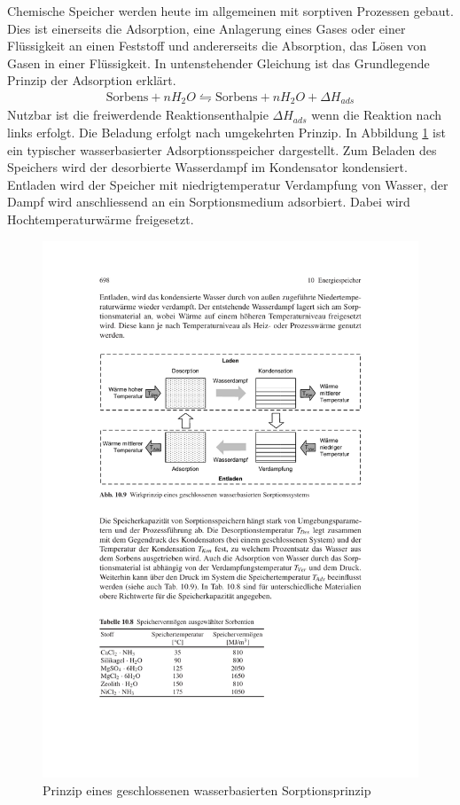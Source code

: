 \documentclass[11pt,a4paper]{scrartcl}
\begin{document}
Chemische Speicher werden heute im allgemeinen mit sorptiven Prozessen gebaut.
Dies ist einerseits die Adsorption, eine Anlagerung eines Gases oder einer
Flüssigkeit an einen Feststoff und andererseits die Absorption, das Lösen von
Gasen in einer Flüssigkeit. In untenstehender Gleichung ist das Grundlegende
Prinzip der Adsorption erklärt.
\begin{align}
\text{Sorbens}+nH_2O\leftrightharpoons \text{Sorbens}+nH_2O+\Delta H_{ads}
\end{align}
Nutzbar ist die freiwerdende Reaktionsenthalpie $\Delta H_{ads}$ wenn die
Reaktion nach links erfolgt. Die Beladung erfolgt nach umgekehrten Prinzip.
In Abbildung \ref{fig:Sorption} ist ein typischer wasserbasierter
Adsorptionsspeicher dargestellt. Zum Beladen des Speichers wird der desorbierte
Wasserdampf im Kondensator kondensiert. Entladen wird der Speicher mit
niedrigtemperatur Verdampfung von Wasser, der Dampf wird anschliessend an ein
Sorptionsmedium adsorbiert. Dabei wird Hochtemperaturwärme freigesetzt. 
\cite{Wesselak}

\begin{figure}[h]
\begin{center}
\includegraphics[scale=1]{images/sorption.pdf}
\caption{Prinzip eines geschlossenen wasserbasierten Sorptionsprinzip
\cite{Wesselak}}
\label{fig:Sorption}
\end{center}
\end{figure}
\end{document}
